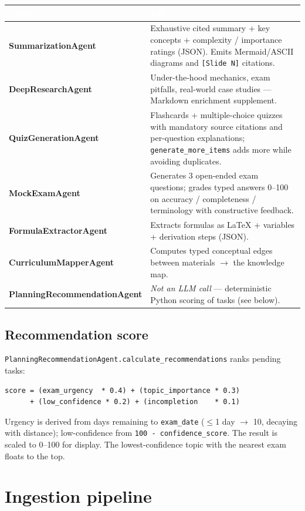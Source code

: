\documentclass[11pt,a4paper]{article}
\newcommand{\code}[1]{\colorbox{fbCream}{\texttt{\small #1}}}
\newcommand{\hdr}[1]{\textcolor{white}{\bfseries #1}}
\begin{document}
\begin{tabularx}{\textwidth}{>{\bfseries}l L}
\toprule
{}\hdr{Agent} & \hdr{Job} \\
\midrule
SummarizationAgent & Exhaustive cited summary + key concepts + complexity /
  importance ratings (JSON). Emits Mermaid/ASCII diagrams and \code{[Slide N]}
  citations. \\
DeepResearchAgent & Under-the-hood mechanics, exam pitfalls, real-world case
  studies --- Markdown enrichment supplement. \\
QuizGenerationAgent & Flashcards + multiple-choice quizzes with mandatory source
  citations and per-question explanations; \code{generate\_more\_items} adds more
  while avoiding duplicates. \\
MockExamAgent & Generates 3 open-ended exam questions; grades typed answers 0--100
  on accuracy / completeness / terminology with constructive feedback. \\
FormulaExtractorAgent & Extracts formulas as LaTeX + variables + derivation steps
  (JSON). \\
CurriculumMapperAgent & Computes typed conceptual edges between materials
  $\rightarrow$ the knowledge map. \\
PlanningRecommendationAgent & \emph{Not an LLM call} --- deterministic Python
  scoring of tasks (see below). \\
\bottomrule
\end{tabularx}

\subsection{Recommendation score}

\code{PlanningRecommendationAgent.calculate\_recommendations} ranks pending tasks:

\begin{lstlisting}
score = (exam_urgency  * 0.4) + (topic_importance * 0.3)
      + (low_confidence * 0.2) + (incompletion    * 0.1)
\end{lstlisting}

Urgency is derived from days remaining to \code{exam\_date} ($\leq$1 day
$\rightarrow$ 10, decaying with distance); low-confidence from
\code{100 - confidence\_score}. The result is scaled to 0--100 for display. The
lowest-confidence topic with the nearest exam floats to the top.

\section{Ingestion pipeline}
\end{document}
